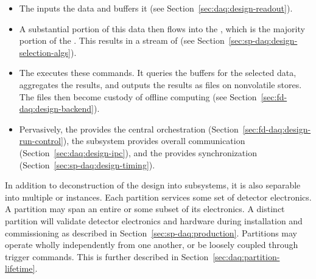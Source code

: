 \begin{itemize}
\item The  inputs the data and buffers it (see Section~\ref{sec:daq:design-readout}).

\item A substantial portion of this data then flows into the , which is the majority portion of the . This results in a stream of  (see Section~\ref{sec:sp-daq:design-selection-algs}).

\item The  executes these commands. It  queries the buffers for the selected data, aggregates the results, and outputs the results as files on nonvolatile stores. The files then become custody of offline computing (see Section~\ref{sec:fd-daq:design-backend}).


\item Pervasively, the   provides the central orchestration (Section~\ref{sec:fd-daq:design-run-control}), the  subsystem provides overall communication (Section~\ref{sec:daq:design-ipc}), and the  provides synchronization (Section~\ref{sec:sp-daq:design-timing}).
\end{itemize}


In addition to deconstruction of the  design into subsystems, it is also separable into multiple  or instances. 
Each partition 
 services some set of detector electronics. 
A partition may span an entire %
  or some subset of its electronics. 
A distinct partition will %
validate detector electronics and hardware during installation and commissioning as described in Section~\ref{sec:sp-daq:production}.
Partitions may operate wholly independently from one another, or be loosely coupled through trigger commands.  
This is further described in Section~\ref{sec:daq:partition-lifetime}.



